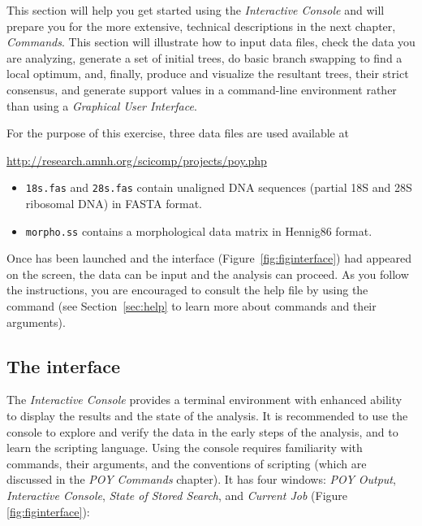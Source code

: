 {This section will help you get started using the \poy \emph{Interactive Console} and will prepare you for the
more extensive, technical descriptions in the next chapter, \emph{\poy Commands}. %
This section will illustrate how to input data files, check the data you are analyzing, generate a set of initial trees, do basic branch swapping to find a local optimum, and, finally, produce and visualize the resultant trees, their strict consensus, and generate support values in a command-line environment rather than using a \emph{Graphical User Interface}. 

For the purpose of this exercise, three data files are used available at \\
\begin{center}
\url{http://research.amnh.org/scicomp/projects/poy.php}
\end{center}

\begin{itemize}
	\item {\texttt{18s.fas} and \texttt{28s.fas} contain unaligned DNA sequences (partial 18S and 28S ribosomal DNA) in FASTA format.~\cite{pearson1988}}
	\item {\texttt{morpho.ss} contains a morphological data matrix in Hennig86 format.~\cite{farris1988}}
\end{itemize}

Once \poy has been launched and the interface (Figure~\ref{fig:figinterface}) had appeared on the screen, the data can be input and the analysis can proceed. As you follow the instructions, you are encouraged to consult the help file by using the command  (see Section~\ref{sec:help} to learn more about \poy commands and their arguments).

\subsection{The interface}

The \emph{Interactive Console} provides a terminal environment with enhanced ability to display the results and the state of the analysis. It is recommended to use the console to explore and verify the data in the early steps of the analysis, and to learn the scripting language. Using the console requires familiarity with \poy commands, their arguments, and the conventions of \poy scripting (which are discussed in the \emph{POY Commands} chapter). It has four windows: \emph{POY Output}, \emph{Interactive Console}, \emph{State of Stored Search}, and \emph{Current Job} (Figure \ref{fig:figinterface}):

}
